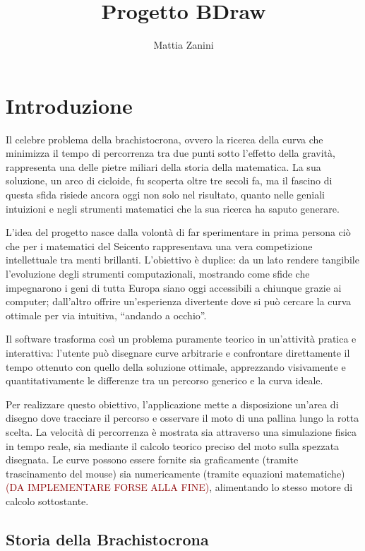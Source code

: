 \documentclass[a4paper,12pt]{article} %
\title{Progetto BDraw}
\author{Mattia Zanini}
\date{}
\begin{document}
\maketitle
\doublespacing

\section{Introduzione}

Il celebre problema della brachistocrona, ovvero la ricerca della curva che minimizza il tempo di percorrenza
tra due punti sotto l'effetto della gravità, rappresenta una delle pietre miliari della storia della matematica.
La sua soluzione, un arco di cicloide, fu scoperta oltre tre secoli fa, ma il fascino di questa sfida risiede
ancora oggi non solo nel risultato, quanto nelle geniali intuizioni e negli strumenti matematici che la sua
ricerca ha saputo generare.

L'idea del progetto nasce dalla volontà di far sperimentare in prima persona ciò che per i matematici del
Seicento rappresentava una vera competizione intellettuale tra menti brillanti. L'obiettivo è duplice: da un
lato rendere tangibile l'evoluzione degli strumenti computazionali, mostrando come sfide che impegnarono i geni
di tutta Europa siano oggi accessibili a chiunque grazie ai computer; dall'altro offrire un'esperienza divertente
dove si può cercare la curva ottimale per via intuitiva, ``andando a occhio''.

Il software trasforma così un problema puramente teorico in un'attività pratica e interattiva: l'utente può
disegnare curve arbitrarie e confrontare direttamente il tempo ottenuto con quello della soluzione ottimale,
apprezzando visivamente e quantitativamente le differenze tra un percorso generico e la curva ideale.

Per realizzare questo obiettivo, l'applicazione mette a disposizione un'area di disegno dove tracciare il
percorso e osservare il moto di una pallina lungo la rotta scelta. La velocità di percorrenza è mostrata sia
attraverso una simulazione fisica in tempo reale, sia mediante il calcolo teorico preciso del moto sulla
spezzata disegnata. Le curve possono essere fornite sia graficamente (tramite trascinamento del mouse) sia
numericamente (tramite equazioni matematiche) \textcolor{darkred}{(DA IMPLEMENTARE FORSE ALLA FINE)},
alimentando lo stesso motore di calcolo sottostante.

\subsection{Storia della Brachistocrona}
\end{document}
